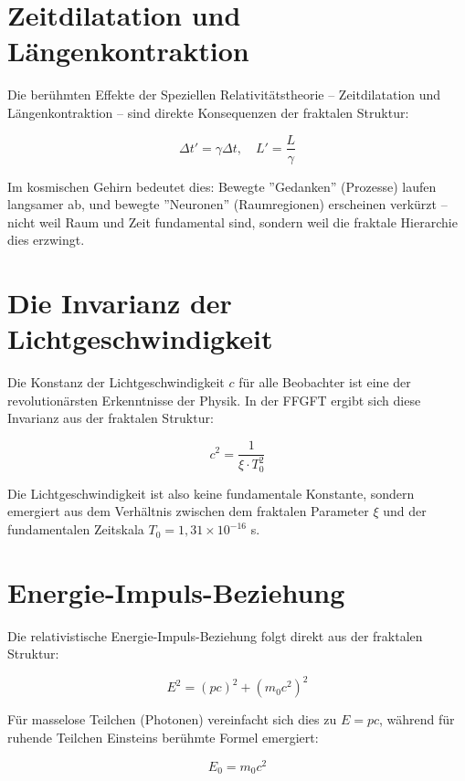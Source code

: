 \documentclass[12pt,a4paper]{article}
\begin{document}
\section{Zeitdilatation und Längenkontraktion}

Die berühmten Effekte der Speziellen Relativitätstheorie -- Zeitdilatation und Längenkontraktion -- sind direkte Konsequenzen der fraktalen Struktur:

\begin{equation}
\Delta t' = \gamma \Delta t, \quad L' = \frac{L}{\gamma}
\end{equation}

Im kosmischen Gehirn bedeutet dies: Bewegte ''Gedanken'' (Prozesse) laufen langsamer ab, und bewegte ''Neuronen'' (Raumregionen) erscheinen verkürzt -- nicht weil Raum und Zeit fundamental sind, sondern weil die fraktale Hierarchie dies erzwingt.

\section{Die Invarianz der Lichtgeschwindigkeit}

Die Konstanz der Lichtgeschwindigkeit $c$ für alle Beobachter ist eine der revolutionärsten Erkenntnisse der Physik. In der FFGFT ergibt sich diese Invarianz aus der fraktalen Struktur:

\begin{equation}
c^2 = \frac{1}{\xi \cdot T_0^2}
\end{equation}

Die Lichtgeschwindigkeit ist also keine fundamentale Konstante, sondern emergiert aus dem Verhältnis zwischen dem fraktalen Parameter $\xi$ und der fundamentalen Zeitskala $T_0 = 1,31 \times 10^{-16}$ s.

\section{Energie-Impuls-Beziehung}

Die relativistische Energie-Impuls-Beziehung folgt direkt aus der fraktalen Struktur:

\begin{equation}
E^2 = (pc)^2 + (m_0c^2)^2
\end{equation}

Für masselose Teilchen (Photonen) vereinfacht sich dies zu $E = pc$, während für ruhende Teilchen Einsteins berühmte Formel emergiert:

\begin{equation}
E_0 = m_0c^2
\end{equation}
\end{document}
